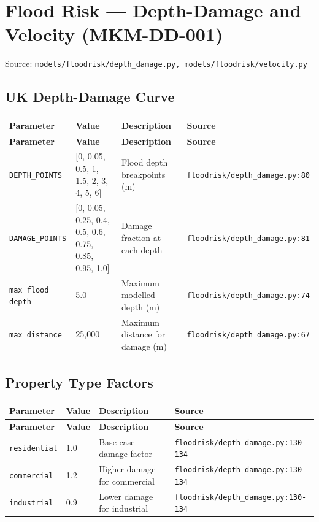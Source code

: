 \documentclass[11pt,a4paper]{article}
\begin{document}
\clearpage

\section{Flood Risk --- Depth-Damage and Velocity (MKM-DD-001)}

Source: \texttt{models/floodrisk/depth\_damage.py, models/floodrisk/velocity.py}

\subsection{UK Depth-Damage Curve}

\begin{longtable}{p{4cm}p{4cm}p{5.5cm}p{3.5cm}}
    \toprule
    \textbf{Parameter} & \textbf{Value} & \textbf{Description} & \textbf{Source} \\
    \midrule
    \endfirsthead
    \toprule
    \textbf{Parameter} & \textbf{Value} & \textbf{Description} & \textbf{Source} \\
    \midrule
    \endhead
    \bottomrule
    \endfoot
    \texttt{DEPTH\_POINTS} & [0, 0.05, 0.5, 1, 1.5, 2, 3, 4, 5, 6] & Flood depth breakpoints (m) & {\scriptsize \texttt{floodrisk/depth\_damage.py:80}} \\
    \texttt{DAMAGE\_POINTS} & [0, 0.05, 0.25, 0.4, 0.5, 0.6, 0.75, 0.85, 0.95, 1.0] & Damage fraction at each depth & {\scriptsize \texttt{floodrisk/depth\_damage.py:81}} \\
    \texttt{max flood depth} & 5.0 & Maximum modelled depth (m) & {\scriptsize \texttt{floodrisk/depth\_damage.py:74}} \\
    \texttt{max distance} & 25,000 & Maximum distance for damage (m) & {\scriptsize \texttt{floodrisk/depth\_damage.py:67}} \\
\end{longtable}

\subsection{Property Type Factors}

\begin{longtable}{p{4cm}p{4cm}p{5.5cm}p{3.5cm}}
    \toprule
    \textbf{Parameter} & \textbf{Value} & \textbf{Description} & \textbf{Source} \\
    \midrule
    \endfirsthead
    \toprule
    \textbf{Parameter} & \textbf{Value} & \textbf{Description} & \textbf{Source} \\
    \midrule
    \endhead
    \bottomrule
    \endfoot
    \texttt{residential} & 1.0 & Base case damage factor & {\scriptsize \texttt{floodrisk/depth\_damage.py:130-134}} \\
    \texttt{commercial} & 1.2 & Higher damage for commercial & {\scriptsize \texttt{floodrisk/depth\_damage.py:130-134}} \\
    \texttt{industrial} & 0.9 & Lower damage for industrial & {\scriptsize \texttt{floodrisk/depth\_damage.py:130-134}} \\
\end{longtable}
\end{document}
